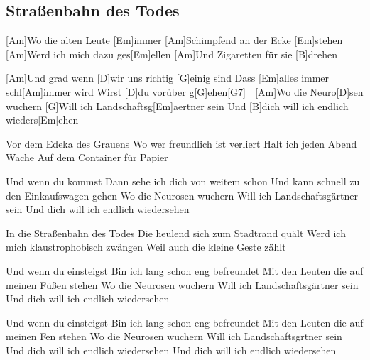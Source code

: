 \subsection*{Straßenbahn des Todes   }
\begin{guitar}


[Am]Wo die alten Leute [Em]immer
[Am]Schimpfend an der Ecke [Em]stehen
[Am]Werd ich mich dazu ges[Em]ellen
[Am]Und Zigaretten für sie [B]drehen

[Am]Und grad wenn [D]wir uns richtig [G]einig sind
Dass [Em]alles immer schl[Am]immer wird
Wirst [D]du vorüber g[G]ehen[G7] $\;$ 
[Am]Wo die Neuro[D]sen wuchern
[G]Will ich Landschaftsg[Em]aertner sein
Und [B]dich will ich endlich wieders[Em]ehen



Vor dem Edeka des Grauens
Wo wer freundlich ist verliert
Halt ich jeden Abend Wache
Auf dem Container für Papier

Und wenn du kommst
Dann sehe ich dich von weitem schon
Und kann schnell zu den Einkaufswagen gehen
Wo die Neurosen wuchern
Will ich Landschaftsgärtner sein
Und dich will ich endlich wiedersehen



In die Straßenbahn des Todes
Die heulend sich zum Stadtrand quält
Werd ich mich klaustrophobisch zwängen
Weil auch die kleine Geste zählt

Und wenn du einsteigst
Bin ich lang schon eng befreundet
Mit den Leuten die auf meinen Füßen stehen
Wo die Neurosen wuchern
Will ich Landschaftsgärtner sein
Und dich will ich endlich wiedersehen


Und wenn du einsteigst
Bin ich lang schon eng befreundet
Mit den Leuten die auf meinen Fen stehen
Wo die Neurosen wuchern
Will ich Landschaftsgrtner sein
Und dich will ich endlich wiedersehen
Und dich will ich endlich wiedersehen
\end{guitar}
